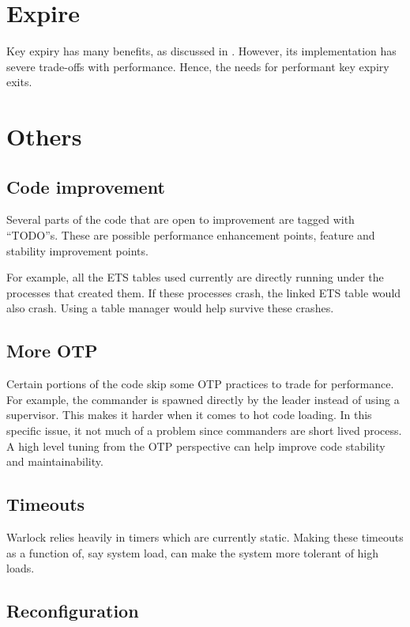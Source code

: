 \section{Expire}

Key expiry has many benefits, as discussed in \citet{a.n.d.expiry}. However, its
implementation has severe trade-offs with performance. Hence, the needs for
performant key expiry exits.

\section{Others}

\subsection{Code improvement}

Several parts of the code that are open to improvement are tagged with 
``TODO''s. These are possible performance enhancement points, feature and
stability improvement points. 

For example, all the ETS tables used currently
are directly running under the processes that created them. If these processes
crash, the linked ETS table would also crash. Using a table manager would
help survive these crashes.

\subsection{More OTP}

Certain portions of the code skip some OTP practices to trade for performance.
For example, the commander is spawned directly by the leader instead of using
a supervisor. This makes it harder when it comes to hot code loading. In this
specific issue, it not much of a problem since commanders are short lived
process. A high level tuning from the OTP perspective can help improve code
stability and maintainability.

\subsection{Timeouts}

Warlock relies heavily in timers which are currently static. Making these
timeouts as a function of, say system load, can make the system more tolerant
of high loads.

\subsection{Reconfiguration}

